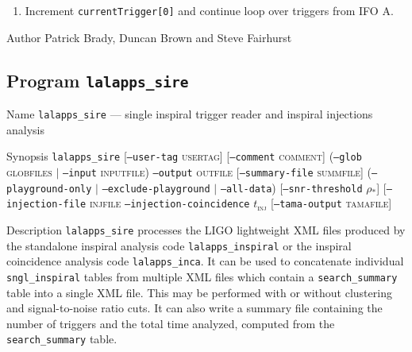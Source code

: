 \begin{entry}
\begin{enumerate}
\begin{enumerate}
\item Increment \texttt{currentTrigger[0]} and continue loop over triggers
from IFO A.
\end{enumerate}
\end{enumerate}

\item[Author] 
Patrick Brady, Duncan Brown and Steve Fairhurst
\end{entry}


\clearpage
\subsection{Program \texttt{lalapps\_sire}}
\label{program:lalapps-sire}

\begin{entry}
\item[Name]
\verb$lalapps_sire$ --- single inspiral trigger reader and inspiral injections
analysis

\item[Synopsis]
\verb$lalapps_sire$  \newline
%
[\texttt{--user-tag} \textsc{usertag}] 
[\texttt{--comment} \textsc{comment}] \newline
%
(\texttt{--glob} \textsc{globfiles} $|$ \texttt{--input} \textsc{inputfile})
\texttt{--output} \textsc{outfile}
[\texttt{--summary-file} \textsc{summfile}] \newline
%
(\texttt{--playground-only} $|$ 
\texttt{--exclude-playground} $|$
\texttt{--all-data})\newline
%
[\texttt{--snr-threshold} \textsc{$\rho_\ast$}]\newline
%
[\texttt{--injection-file} \textsc{injfile} 
\texttt{--injection-coincidence} \textsc{$t_\mathrm{inj}$}\newline
{}\newline
%
[\texttt{--tama-output} \textsc{tamafile}] 

\item[Description] 
\verb$lalapps_sire$ processes the LIGO lightweight XML files produced by the
standalone inspiral analysis code \verb$lalapps_inspiral$ or the inspiral
coincidence analysis code \verb$lalapps_inca$. It can be used to concatenate
individual \verb$sngl_inspiral$ tables from multiple XML files which contain a
\verb$search_summary$ table into a single XML file. This may be performed with
or without clustering and signal-to-noise ratio cuts. It can also write a
summary file containing the number of triggers and the total time analyzed,
computed from the \verb$search_summary$ table.


\end{entry}

